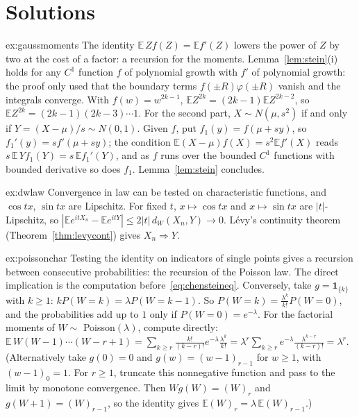 \section{Solutions}

\begin{solution}{ex:gaussmoments}
\idea The identity $\mathbb E\,Zf(Z)=\mathbb Ef'(Z)$ lowers the power of $Z$ by two at the cost of a factor: a recursion for the moments.
\writeup Lemma~\ref{lem:stein}(i) holds for any $C^1$ function $f$ of polynomial growth with $f'$ of polynomial growth: the proof only used that the boundary terms
$f(\pm R)\varphi(\pm R)$ vanish and the integrals converge. With $f(w)=w^{2k-1}$, $\mathbb EZ^{2k}=(2k-1)\mathbb EZ^{2k-2}$, so $\mathbb EZ^{2k}=(2k-1)(2k-3)\cdots1$.
For the second part, $X\sim N(\mu,s^2)$ if and only if $Y=(X-\mu)/s\sim N(0,1)$. Given $f$, put $f_1(y)=f(\mu+sy)$, so $f_1'(y)=sf'(\mu+sy)$; the condition
$\mathbb E(X-\mu)f(X)=s^2\mathbb Ef'(X)$ reads $s\,\mathbb E\,Yf_1(Y)=s\,\mathbb Ef_1'(Y)$, and as $f$ runs over the bounded $C^1$ functions with bounded derivative so does $f_1$.
Lemma~\ref{lem:stein} concludes.
\end{solution}

\begin{solution}{ex:dwlaw}
\idea Convergence in law can be tested on characteristic functions, and $\cos tx$, $\sin tx$ are Lipschitz.
\writeup For fixed $t$, $x\mapsto\cos tx$ and $x\mapsto\sin tx$ are $|t|$-Lipschitz, so $|\mathbb Ee^{itX_n}-\mathbb Ee^{itY}|\le2|t|\,d_W(X_n,Y)\to0$. L\'evy's continuity theorem
(Theorem~\ref{thm:levycont}) gives $X_n\Rightarrow Y$.
\end{solution}

\begin{solution}{ex:poissonchar}
\idea Testing the identity on indicators of single points gives a recursion between consecutive probabilities: the recursion of the Poisson law.
\writeup The direct implication is the computation before~\eqref{eq:chensteineq}. Conversely, take $g=\mathbf 1_{\{k\}}$ with $k\ge1$: $kP(W=k)=\lambda P(W=k-1)$. So
$P(W=k)=\frac{\lambda^k}{k!}P(W=0)$, and the probabilities add up to $1$ only if $P(W=0)=e^{-\lambda}$. For the factorial moments of $W\sim$ Poisson$(\lambda)$, compute
directly: $\mathbb E\,W(W-1)\cdots(W-r+1)=\sum_{k\ge r}\frac{k!}{(k-r)!}e^{-\lambda}\frac{\lambda^k}{k!}=\lambda^r\sum_{k\ge r}e^{-\lambda}\frac{\lambda^{k-r}}{(k-r)!}=\lambda^r$. (Alternatively take $g(0)=0$ and $g(w)=(w-1)_{r-1}$ for $w\ge1$, with $(w-1)_0=1$. For $r\ge1$, truncate this nonnegative function and pass to the limit by monotone convergence. Then $Wg(W)=(W)_r$ and $g(W+1)=(W)_{r-1}$, so the identity gives $\mathbb E(W)_r=\lambda\,\mathbb E(W)_{r-1}$.)
\end{solution}

